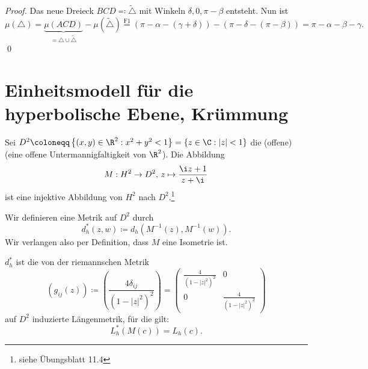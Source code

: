 \begin{remark}
\begin{enumerate}
\begin{proof}
      Das neue Dreieck \( BCD \eqqcolon \widetilde{\triangle} \) mit Winkeln \( \delta, 0, \pi - \beta \) entsteht. Nun ist
      \begin{equation*}
        \mu(\triangle) = \underbrace{\mu(ACD)}_{= \triangle \cup \widetilde{\triangle}} - \mu(\widetilde{\triangle}) \overset{\text{F1}}{=} \left( \pi - \alpha - (\gamma + \delta) \right) - \left( \pi - \delta - (\pi - \beta) \right) = \pi - \alpha - \beta - \gamma\text{.}
      \end{equation*} \qed
    \end{proof}
  \end{enumerate}
\end{remark}

\section{Einheitsmodell für die hyperbolische Ebene, Krümmung}

Sei \( D^2 \coloneqq \left \{ (x,y) \in \R^2 : x^2 + y^2 < 1 \right \} = \left \{ z \in \C : \left\vert z \right\vert < 1 \right \} \) die (offene)  (eine offene Untermannigfaltigkeit von \( \R^2 \)). Die Abbildung
\begin{equation*}
  M : H^2 \to D^2\text{,} \ z \mapsto \frac{\i z + 1}{z + \i}
\end{equation*}
ist eine injektive Abbildung von \( H^2 \) nach \( D^2 \).\footnote{siehe Übungsblatt 11.4}

Wir definieren eine Metrik auf \( D^2 \) durch
\begin{equation*}
  d_h^\ast(z,w) \coloneqq d_h\left( M^{-1}(z),M^{-1}(w) \right)\text{.}
\end{equation*}
Wir verlangen also per Definition, dass \( M \) eine Isometrie ist.

\begin{remark}
  \( d_h^\ast \) ist die von der riemannschen Metrik
  \begin{equation*}
    \left( g_{ij}(z) \right) \coloneqq \left( \frac{4\delta_{ij}}{\left( 1-\left\vert z \right\vert^2 \right)^2} \right) = \begin{pmatrix}
      \frac{4}{\left( 1-\left\vert z \right\vert^2 \right)^2} & 0 \\
      0 & \frac{4}{\left( 1-\left\vert z \right\vert^2 \right)^2}
    \end{pmatrix}
  \end{equation*}
  auf \( D^2 \) induzierte Längenmetrik, für die gilt:
  \begin{equation*}
    L_h^\ast(M(c)) = L_h(c)\text{.}
  \end{equation*}
\end{remark}

